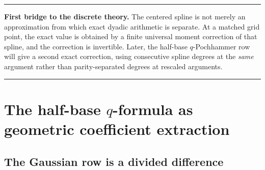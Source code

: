 \documentclass[11pt,oneside]{article}
\theoremstyle{definition}
\theoremstyle{remark}
\newenvironment{boxedremark}{%
  \par\smallskip\noindent\begin{center}\begin{minipage}{0.94\textwidth}%
  \color{black}\hrule\vspace{0.6em}\small
}{%
  \vspace{0.6em}\hrule\end{minipage}\end{center}\smallskip
}
\begin{document}
\begin{boxedremark}
\textbf{First bridge to the discrete theory.}
The centered spline is not merely an approximation from which exact dyadic arithmetic is
separate.  At a matched grid point, the exact value is obtained by a finite universal moment
correction of that spline, and the correction is invertible.  Later, the half-base
$q$-Pochhammer row will give a second exact correction, using consecutive spline degrees at
the \emph{same} argument rather than parity-separated degrees at rescaled arguments.
\end{boxedremark}

\section[The half-base q-formula as geometric coefficient extraction]{The half-base $q$-formula as geometric coefficient extraction}
\label{dyadicweb:sec:q-extraction}

\subsection{The Gaussian row is a divided difference}
\end{document}
